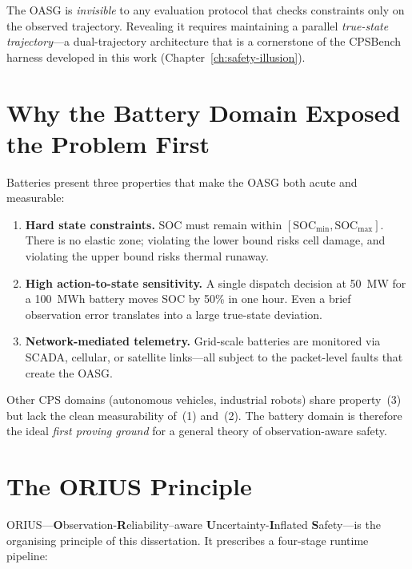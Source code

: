 The OASG is \emph{invisible} to any evaluation protocol that checks
constraints only on the observed trajectory.  Revealing it requires
maintaining a parallel \emph{true-state trajectory}---a dual-trajectory
architecture that is a cornerstone of the CPSBench harness developed in
this work (Chapter~\ref{ch:safety-illusion}).

\section{Why the Battery Domain Exposed the Problem First}

Batteries present three properties that make the OASG both acute and
measurable:

\begin{enumerate}
  \item \textbf{Hard state constraints.}  SOC must remain within
    $[\text{SOC}_{\min}, \text{SOC}_{\max}]$.  There is no elastic zone;
    violating the lower bound risks cell damage, and violating the upper
    bound risks thermal runaway.
  \item \textbf{High action-to-state sensitivity.}  A single dispatch
    decision at 50~MW for a 100~MWh battery moves SOC by 50\% in one hour.
    Even a brief observation error translates into a large true-state
    deviation.
  \item \textbf{Network-mediated telemetry.}  Grid-scale batteries are
    monitored via SCADA, cellular, or satellite links---all subject to the
    packet-level faults that create the OASG.
\end{enumerate}

Other CPS domains (autonomous vehicles, industrial robots) share
property~(3) but lack the clean measurability of~(1) and~(2).  The battery
domain is therefore the ideal \emph{first proving ground} for a general
theory of observation-aware safety.

\section{The ORIUS Principle}
\label{sec:orius-principle}

ORIUS---\textbf{O}bservation-\textbf{R}eliability--aware
\textbf{U}ncertainty-\textbf{I}nflated \textbf{S}afety---is the
organising principle of this dissertation.  It prescribes a four-stage
runtime pipeline:

